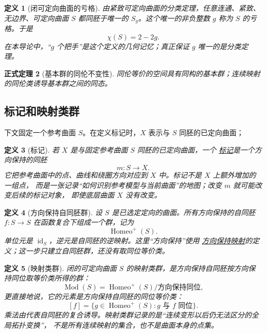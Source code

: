 \documentclass[UTF8,fontset=none,a4paper,11pt]{ctexart}
\theoremstyle{foundation-definition}
\newtheorem{definition}{定义}[section]
\theoremstyle{foundation-theorem}
\newtheorem{theorem}[definition]{正式定理}
\theoremstyle{foundation-proposition}
\theoremstyle{foundation-example}
\theoremstyle{foundation-remark}
\theoremstyle{foundation-theorem}
\newcommand{\Mod}{\operatorname{Mod}}
\newcommand{\term}[2]{\hyperref[#1]{#2}}
\begin{document}
\begin{definition}[闭可定向曲面的亏格]\label{def:genus}
由紧致可定向曲面的分类定理，任意连通、紧致、无边界、可定向曲面 \(S\) 都同胚于唯一的
\(S_g\)。这个唯一的非负整数 \(g\) 称为 \(S\) 的亏格。于是
\[
\chi(S)=2-2g.
\]
在本导论中，“\(g\) 个把手”是这个定义的几何记忆；真正保证 \(g\) 唯一的是分类定理。
\end{definition}

\begin{theorem}[基本群的同伦不变性]
同伦等价的空间具有同构的基本群；连续映射的同伦类诱导基本群之间的同态。
\end{theorem}

\subsection{标记和映射类群}

下文固定一个参考曲面 \(S\)。在定义标记时，\(X\) 表示与 \(S\) 同胚的已定向曲面；

\begin{definition}[标记]\label{def:marking}
若 \(X\) 是与固定参考曲面 \(S\) 同胚的已定向曲面，一个
\term{def:marking}{标记}是一个方向保持的同胚
\[
m:S\longrightarrow X.
\]
它把参考曲面中的点、曲线和绕圈方向对应到 \(X\) 中。标记不是 \(X\) 上额外增加的一组点，
而是一张记录“如何识别参考模型与当前曲面”的地图；改变 \(m\) 就可能改变后续的标记对象，
即使底层曲面 \(X\) 没有改变。
\end{definition}

\begin{definition}[方向保持自同胚群]\label{def:orientation-preserving-homeomorphism-group}
设 \(S\) 是已选定定向的曲面。所有方向保持的自同胚
\(f:S\to S\) 在函数复合下组成一个群，记为
\[
\operatorname{Homeo}^{+}(S).
\]
单位元是 \(\operatorname{id}_S\)，逆元是自同胚的逆映射。这里“方向保持”使用
\term{def:orientation-preserving}{方向保持映射}的定义；这一步只建立自同胚群，还没有取同位等价类。
\end{definition}

\begin{definition}[映射类群]\label{def:mapping-class}
闭的可定向曲面 \(S\) 的映射类群，是方向保持自同胚按方向保持同位取等价类所得的群：
\[
\Mod(S)=\operatorname{Homeo}^+(S)/\text{方向保持同位},
\]
更直接地说，它的元素是方向保持自同胚的同位等价类：
\[
[f]=\{g\in\operatorname{Homeo}^+(S):g\text{ 与 }f\text{ 同位}\}.
\]
乘法由代表自同胚的复合诱导。映射类群记录的是“连续变形以后仍无法区分的全局拓扑变换”，
不是所有连续映射的集合，也不是曲面本身的点集。
\end{definition}
\end{document}
